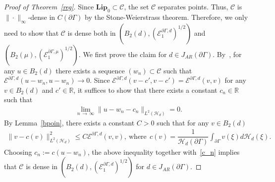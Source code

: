 \documentclass[10pt]{amsart}
\theoremstyle{definition}\newtheorem{defi}[theo]{Definition}\newtheorem{rema}[theo]{Remark}\newtheorem{exam}[theo]{Example}\newtheorem{exem}[theo]{Example}\newtheorem{nota}[theo]{Notation}
\newcommand{\ce}{\mathcal{E}}
\newcommand{\ch}{\mathcal{H}}
\newcommand{\cC}{\mathcal{C}}
\newcommand{\br}{\mathbb{R}}
\newcommand{\bfLip}{\mathbf{Lip}}
\begin{document}
\begin{proof}[{Proof of Theorem~\ref{reg}}]
Since $\bfLip_0\subset\cC$, the set $\cC$ separates points. Thus, $\cC$ is $\|\cdot\|_{\infty}$-dense in $C(\partial\Gamma)$ by the Stone-Weierstrass theorem. Therefore, we only need to show that $\cC$ is dense both in $(B_2(d), (\ce^{\partial\Gamma,d}_1)^{1/2})$ and $(B_{2}(\mu),(\ce^{\partial\Gamma,\mu}_1)^{1/2})$. We first prove the claim for $d\in J_{AR}(\partial\Gamma)$. By~\cite[Proposition~3.13]{Cos}, for any $u\in B_2(d)$ there exists a sequence $(w_n)\subset\cC$ such that $\ce^{\partial\Gamma,d}(u-w_n,u-w_n)\rightarrow0$. Since $\ce^{\partial\Gamma,d}(v-c',v-c')=\ce^{\partial\Gamma,d}(v,v)$ for any $v\in B_2(d)$ and $c'\in\br$, it suffices to show that there exists a constant $c_n\in\br$ such that
\begin{align}\label{c_n}
\lim_{n\,\to\,\infty}\|u-w_n-c_n\|_{L^2(\ch_{d})}=0.
\end{align}
By Lemma~\ref{bpoin}, there exists a constant $C>0$ such that for any $v\in B_2(d)$
\begin{align*}
\|v-c(v)\|_{L^2(\ch_{d})}^2\leq C\ce^{\partial\Gamma,d}(v,v),\ \text{where}\ \ c(v)=\dfrac{1}{\ch_d(\partial\Gamma)}\int_{\partial\Gamma}v(\xi)d\ch_d(\xi).
\end{align*}
Choosing $c_n:=c(u-w_n)$, the above inequality together with~\eqref{c_n} implies that $\cC$ is dense in $(B_2(d),(\ce^{\partial\Gamma,d}_1)^{1/2})$ for $d\in J_{AR}(\partial\Gamma)$.



\end{proof}
\end{document}
